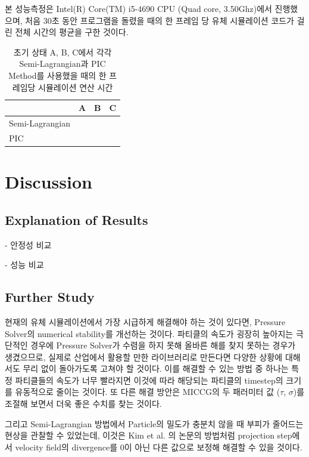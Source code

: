 \documentclass[10pt, A4]{article}
\begin{document}
본 성능측정은 Intel(R) Core(TM) i5-4690 CPU (Quad core, 3.50Ghz)에서 진행했으며, 처음 30초 동안 프로그램을 돌렸을 때의 한 프레임 당 유체 시뮬레이션 코드가 걸린 전체 시간의 평균을 구한 것이다.

\begin{table}[h]
\centering
\begin{tabular}{|l|l|l|l|}
\hline
                & A & B & C \\ \hline
Semi-Lagrangian &   &   &   \\ \hline
PIC             &   &   &   \\ \hline
\end{tabular}
\caption{초기 상태 A, B, C에서 각각 Semi-Lagrangian과 PIC Method를 사용했을 때의 한 프레임당 시뮬레이션 연산 시간}
\end{table}

\section{Discussion}

\subsection{Explanation of Results}

- 안정성 비교

- 성능 비교

\subsection{Further Study}

현재의 유체 시뮬레이션에서 가장 시급하게 해결해야 하는 것이 있다면, Pressure Solver의 numerical stability를 개선하는 것이다. 파티클의 속도가 굉장히 높아지는 극단적인 경우에 Pressure Solver가 수렴을 하지 못해 올바른 해를 찾지 못하는 경우가 생겼으므로, 실제로 산업에서 활용할 만한 라이브러리로 만든다면 다양한 상황에 대해서도 무리 없이 돌아가도록 고쳐야 할 것이다. 이를 해결할 수 있는 방법 중 하나는 특정 파티클들의 속도가 너무 빨라지면 이것에 따라 해당되는 파티클의 timestep의 크기를 유동적으로 줄이는 것이다. \cite[p. 35]{fluid-sim-cg} 또 다른 해결 방안은 MICCG의 두 패러미터 값 ($\tau$, $\sigma$)를 조절해 보면서 더욱 좋은 수치를 찾는 것이다.

그리고 Semi-Lagrangian 방법에서 Particle의 밀도가 충분치 않을 때 부피가 줄어드는 현상을 관찰할 수 있었는데, 이것은 Kim et al. \cite{volume-preservation} 의 논문의 방법처럼 projection step에서 velocity field의 divergence를 0이 아닌 다른 값으로 보정해 해결할 수 있을 것이다.
\end{document}
